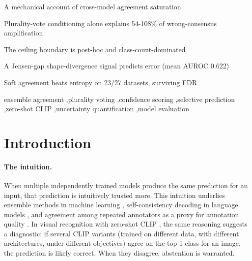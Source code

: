 \documentclass[a4paper,fleqn]{cas-sc}
\begin{document}
\begin{highlights}
\item A mechanical account of cross-model agreement saturation
\item Plurality-vote conditioning alone explains 54-108\% of wrong-consensus amplification
\item The ceiling boundary is post-hoc and class-count-dominated
\item A Jensen-gap shape-divergence signal predicts error (mean AUROC 0.622)
\item Soft agreement beats entropy on 23/27 datasets, surviving FDR
\end{highlights}

\begin{keywords}
ensemble agreement \sep plurality voting \sep confidence scoring \sep selective prediction \sep zero-shot CLIP \sep uncertainty quantification \sep model evaluation
\end{keywords}

\maketitle

\section{Introduction}

\paragraph{The intuition.}
When multiple independently trained models produce the same prediction for an input, that prediction is intuitively trusted more.
This intuition underlies ensemble methods in machine learning \citep{lakshminarayanan2017simple}, self-consistency decoding in language models \citep{wang2023selfconsistency}, and agreement among repeated annotators as a proxy for annotation quality \citep{sheng2008get}.
In visual recognition with zero-shot CLIP \citep{radford2021learning}, the same reasoning suggests a diagnostic: if several CLIP variants (trained on different data, with different architectures, under different objectives) agree on the top-1 class for an image, the prediction is likely correct. When they disagree, abstention is warranted.
\end{document}
